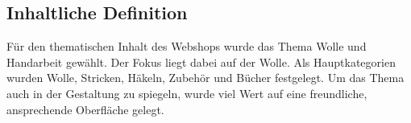 \subsection{Inhaltliche Definition}
Für den thematischen Inhalt des Webshops wurde das Thema Wolle und Handarbeit gewählt.
Der Fokus liegt dabei auf der Wolle. Als Hauptkategorien wurden Wolle, Stricken, Häkeln, Zubehör und Bücher festgelegt.
Um das Thema auch in der Gestaltung zu spiegeln, wurde viel Wert auf eine freundliche, ansprechende Oberfläche gelegt.

